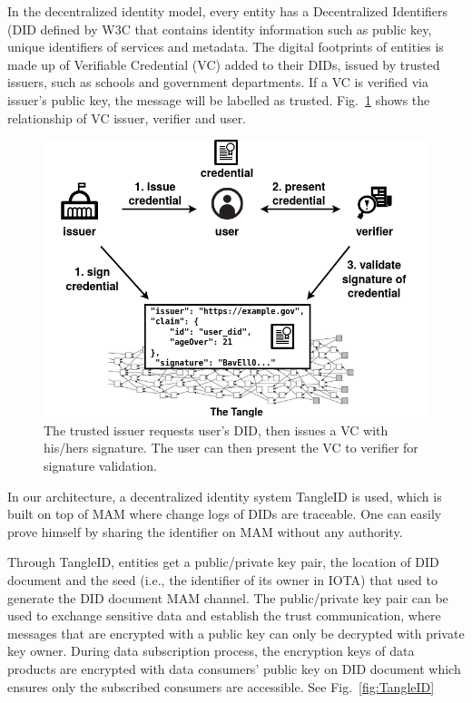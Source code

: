 \documentclass[conference]{IEEEtran}
\begin{document}
In the decentralized identity model, every entity has a Decentralized Identifiers (DID\cite{DID} defined by W3C that contains identity information such as public key, unique identifiers of services and metadata. The digital footprints of entities is made up of Verifiable Credential (VC) added to their DIDs, issued by trusted issuers, such as schools and government departments. If a VC is verified via issuer's public key, the message will be labelled as trusted. Fig.~\ref{fig:did_vc} shows the relationship of VC issuer, verifier and user.

\begin{figure}[h]
    \centering
    \includegraphics[width=3.in]{DID_VC}
    \caption{The trusted issuer requests user's DID, then issues a VC with his/hers signature. The user can then present the VC to verifier for signature validation.}
    \label{fig:did_vc}
\end{figure}

In our architecture, a decentralized identity system TangleID\cite{TangleID} is used, which is built on top of MAM where change logs of DIDs are traceable. One can easily prove himself by sharing the identifier on MAM without any authority.

Through TangleID, entities get a public/private key pair, the location of DID document and the seed (i.e., the identifier of its owner in IOTA) that used to generate the DID document MAM channel. The public/private key pair can be used to exchange sensitive data and establish the trust communication, where messages that are encrypted with a public key can only be decrypted with private key owner. During data subscription process, the encryption keys of data products are encrypted with data consumers' public key on DID document which ensures only the subscribed consumers are accessible. See Fig.~\ref{fig:TangleID}
\end{document}
